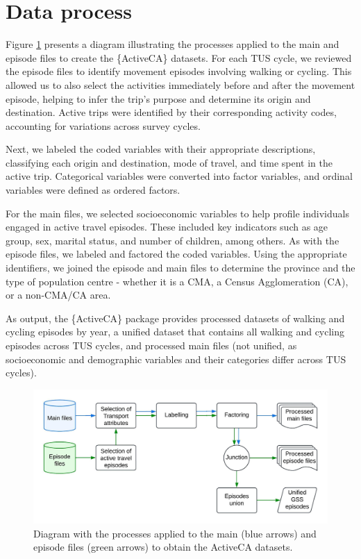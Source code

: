 \documentclass[Royal,times,sageh]{sagej}
\begin{document}
\section{Data process}\label{data-process}

Figure \ref{fig:process-figure} presents a diagram illustrating the
processes applied to the main and episode files to create the
\{ActiveCA\} datasets. For each TUS cycle, we reviewed the episode files
to identify movement episodes involving walking or cycling. This allowed
us to also select the activities immediately before and after the
movement episode, helping to infer the trip's purpose and determine its
origin and destination. Active trips were identified by their
corresponding activity codes, accounting for variations across survey
cycles.

Next, we labeled the coded variables with their appropriate
descriptions, classifying each origin and destination, mode of travel,
and time spent in the active trip. Categorical variables were converted
into factor variables, and ordinal variables were defined as ordered
factors.

For the main files, we selected socioeconomic variables to help profile
individuals engaged in active travel episodes. These included key
indicators such as age group, sex, marital status, and number of
children, among others. As with the episode files, we labeled and
factored the coded variables. Using the appropriate identifiers, we
joined the episode and main files to determine the province and the type
of population centre - whether it is a CMA, a Census Agglomeration (CA),
or a non-CMA/CA area.

As output, the \{ActiveCA\} package provides processed datasets of
walking and cycling episodes by year, a unified dataset that contains
all walking and cycling episodes across TUS cycles, and processed main
files (not unified, as socioeconomic and demographic variables and their
categories differ across TUS cycles).

\begin{figure}

{\centering \includegraphics[width=1\linewidth]{Manuscript-figures/RPackages - ActiveCA} 

}

\caption{Diagram with the processes applied to the main (blue arrows) and episode files (green arrows) to obtain the ActiveCA datasets.}\label{fig:process-figure}
\end{figure}
\end{document}
